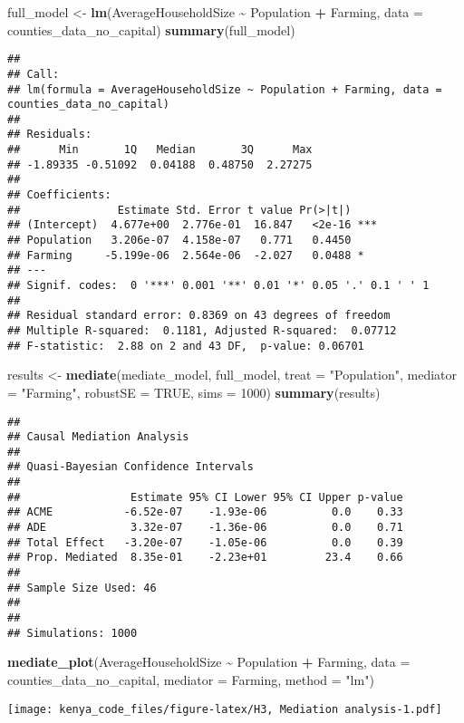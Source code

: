 \documentclass[
]{article}
\newenvironment{Shaded}{\begin{snugshade}}{\end{snugshade}}
\newcommand{\AttributeTok}[1]{\textcolor[rgb]{0.13,0.29,0.53}{#1}}
\newcommand{\ConstantTok}[1]{\textcolor[rgb]{0.56,0.35,0.01}{#1}}
\newcommand{\DecValTok}[1]{\textcolor[rgb]{0.00,0.00,0.81}{#1}}
\newcommand{\FunctionTok}[1]{\textcolor[rgb]{0.13,0.29,0.53}{\textbf{#1}}}
\newcommand{\NormalTok}[1]{#1}
\newcommand{\OtherTok}[1]{\textcolor[rgb]{0.56,0.35,0.01}{#1}}
\newcommand{\SpecialCharTok}[1]{\textcolor[rgb]{0.81,0.36,0.00}{\textbf{#1}}}
\newcommand{\StringTok}[1]{\textcolor[rgb]{0.31,0.60,0.02}{#1}}
\begin{document}
\begin{Shaded}
\begin{Highlighting}[]
\NormalTok{full\_model }\OtherTok{\textless{}{-}} \FunctionTok{lm}\NormalTok{(AverageHouseholdSize }\SpecialCharTok{\textasciitilde{}}\NormalTok{ Population }\SpecialCharTok{+}\NormalTok{ Farming, }\AttributeTok{data =}\NormalTok{ counties\_data\_no\_capital)}
\FunctionTok{summary}\NormalTok{(full\_model)}
\end{Highlighting}
\end{Shaded}

\begin{verbatim}
## 
## Call:
## lm(formula = AverageHouseholdSize ~ Population + Farming, data = counties_data_no_capital)
## 
## Residuals:
##      Min       1Q   Median       3Q      Max 
## -1.89335 -0.51092  0.04188  0.48750  2.27275 
## 
## Coefficients:
##               Estimate Std. Error t value Pr(>|t|)    
## (Intercept)  4.677e+00  2.776e-01  16.847   <2e-16 ***
## Population   3.206e-07  4.158e-07   0.771   0.4450    
## Farming     -5.199e-06  2.564e-06  -2.027   0.0488 *  
## ---
## Signif. codes:  0 '***' 0.001 '**' 0.01 '*' 0.05 '.' 0.1 ' ' 1
## 
## Residual standard error: 0.8369 on 43 degrees of freedom
## Multiple R-squared:  0.1181, Adjusted R-squared:  0.07712 
## F-statistic:  2.88 on 2 and 43 DF,  p-value: 0.06701
\end{verbatim}

\begin{Shaded}
\begin{Highlighting}[]
\NormalTok{results }\OtherTok{\textless{}{-}} \FunctionTok{mediate}\NormalTok{(mediate\_model, full\_model, }\AttributeTok{treat =} \StringTok{"Population"}\NormalTok{, }\AttributeTok{mediator =} \StringTok{"Farming"}\NormalTok{, }\AttributeTok{robustSE =} \ConstantTok{TRUE}\NormalTok{, }\AttributeTok{sims =} \DecValTok{1000}\NormalTok{)}
\FunctionTok{summary}\NormalTok{(results)}
\end{Highlighting}
\end{Shaded}

\begin{verbatim}
## 
## Causal Mediation Analysis 
## 
## Quasi-Bayesian Confidence Intervals
## 
##                 Estimate 95% CI Lower 95% CI Upper p-value
## ACME           -6.52e-07    -1.93e-06          0.0    0.33
## ADE             3.32e-07    -1.36e-06          0.0    0.71
## Total Effect   -3.20e-07    -1.05e-06          0.0    0.39
## Prop. Mediated  8.35e-01    -2.23e+01         23.4    0.66
## 
## Sample Size Used: 46 
## 
## 
## Simulations: 1000
\end{verbatim}

\begin{Shaded}
\begin{Highlighting}[]
\FunctionTok{mediate\_plot}\NormalTok{(AverageHouseholdSize }\SpecialCharTok{\textasciitilde{}}\NormalTok{ Population }\SpecialCharTok{+}\NormalTok{ Farming, }\AttributeTok{data =}\NormalTok{ counties\_data\_no\_capital, }\AttributeTok{mediator =}\NormalTok{ Farming, }\AttributeTok{method =} \StringTok{"lm"}\NormalTok{)}
\end{Highlighting}
\end{Shaded}

\texttt{[image: kenya\_code\_files/figure-latex/H3, Mediation analysis-1.pdf]}
\end{document}
